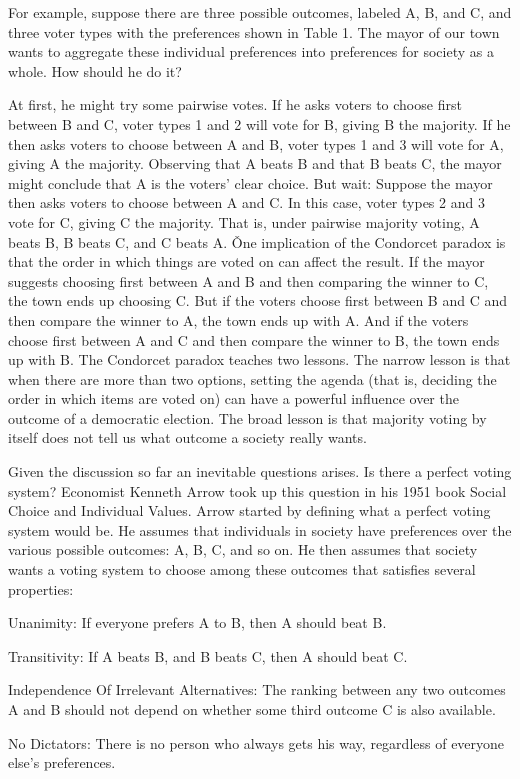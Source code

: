 \be
For example, suppose there are three possible outcomes, labeled A, B, and C, and three voter types with the
preferences shown in Table 1. The mayor of our town wants to aggregate these individual preferences into preferences
for society as a whole. How should he do it?


At first, he might try some pairwise votes. If he asks voters to choose first between B and C, voter types 1 and 2
will vote for B, giving B the majority. If he then asks voters to choose between A and B, voter types 1 and 3 will
vote for A, giving A the majority. Observing that A beats B and that B beats C, the mayor might conclude that A is
the voters' clear choice. But wait: Suppose the mayor then asks voters to choose between A and C. In this case, voter
types 2 and 3 vote for C, giving C the majority. That is, under pairwise majority voting, A beats B, B beats C, and C
beats A. \v

One implication of the Condorcet paradox is that the order in which things are voted on can affect the result. If the
mayor suggests choosing first between A and B and then comparing the winner to C, the town ends up choosing C. But if
the voters choose first between B and C and then compare the winner to A, the town ends up with A. And if the voters
choose first between A and C and then compare the winner to B, the town ends up with B. The Condorcet paradox teaches
two lessons. The narrow lesson is that when there are more than two options, setting the agenda (that is, deciding
the order in which items are voted on) can have a powerful influence over the outcome of a democratic election. The
broad lesson is that majority voting by itself does not tell us what outcome a society really wants.
\ee

Given the discussion so far an inevitable questions arises. Is there a perfect voting system? Economist Kenneth Arrow
took up this question in his 1951 book Social Choice and Individual Values. Arrow started by defining what a perfect
voting system would be. He assumes that individuals in society have preferences over the various possible outcomes:
A, B, C, and so on. He then assumes that society wants a voting system to choose among these outcomes that satisfies
several properties:
\bit
\item{Unanimity}: If everyone prefers A to B, then A should beat B.
\item{Transitivity}: If A beats B, and B beats C, then A should beat C.
\item{Independence Of Irrelevant Alternatives}: The ranking between any two outcomes A and B should not depend on
whether some third outcome C is also available.
\item{No Dictators}: There is no person who always gets his way, regardless of everyone else's preferences.
\eit

